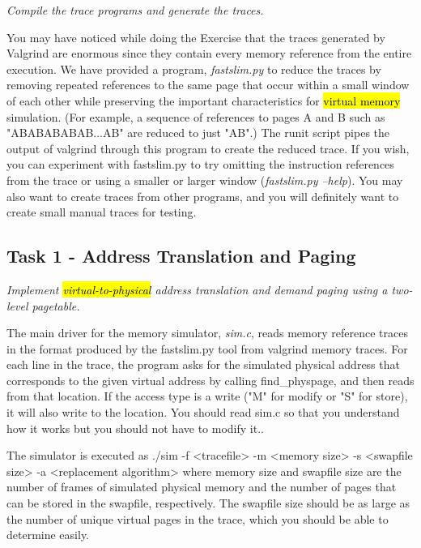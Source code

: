 \documentclass[12pt]{article}
\begin{document}
\bigskip

\noindent \textit{Compile the trace programs and generate the traces.}

\bigskip

\noindent You may have noticed while doing the Exercise that the traces generated
by Valgrind are enormous since they contain every memory reference from the entire
execution. We have provided a program, \textit{fastslim.py} to reduce the traces by removing
repeated references to the same page that occur within a small window of each other
while preserving the important characteristics for \hl{virtual memory} simulation.
(For example, a sequence of references to pages A and B such as "ABABABABAB...AB"
are reduced to just "AB".) The runit script pipes the output of valgrind through
this program to create the reduced trace. If you wish, you can experiment with
fastslim.py to try omitting the instruction references from the trace or using a
smaller or larger window (\textit{fastslim.py --help}). You may also want to create traces
from other programs, and you will definitely want to create small manual traces
for testing.

\subsection{Task 1 - Address Translation and Paging}

\bigskip

\textit{Implement \hl{virtual-to-physical} address translation and demand paging using a
two-level pagetable.}

\bigskip

\noindent The main driver for the memory simulator, \textit{sim.c}, reads memory reference traces in
the format produced by the fastslim.py tool from valgrind memory traces. For each
line in the trace, the program asks for the simulated physical address that
corresponds to the given virtual address by calling find\_physpage, and then reads
from that location. If the access type is a write ("M" for modify or "S" for store),
it will also write to the location. You should read sim.c so that you understand how
it works but you should not have to modify it..

\bigskip

\noindent The simulator is executed as ./sim -f <tracefile> -m <memory size> -s <swapfile size>
-a <replacement algorithm> where memory size and swapfile size are the number of
frames of simulated physical memory and the number of pages that can be stored in
the swapfile, respectively. The swapfile size should be as large as the number of
unique virtual pages in the trace, which you should be able to determine easily.
\end{document}
